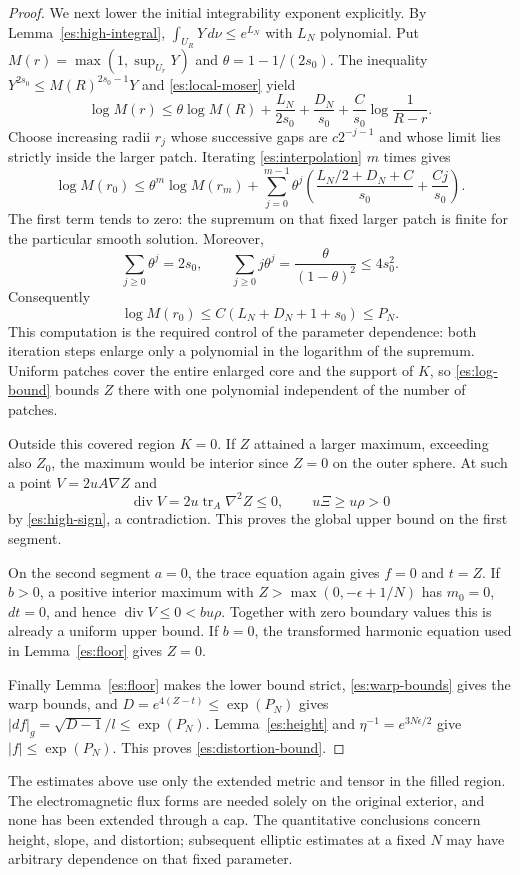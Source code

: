 \begin{proof}
We next lower the initial integrability exponent explicitly.
By Lemma~\ref{es:high-integral},
$\int_{U_R}Y\,d\nu\le e^{L_N}$ with $L_N$ polynomial.
Put $M(r)=\max(1,\sup_{U_r}Y)$ and
$\theta=1-1/(2s_0)$.  The inequality
$Y^{2s_0}\le M(R)^{2s_0-1}Y$ and
\eqref{es:local-moser} yield
\begin{equation}\label{es:interpolation}
 \log M(r)\le\theta\log M(R)
       +\frac{L_N}{2s_0}+\frac{D_N}{s_0}
       +\frac C{s_0}\log\frac1{R-r}.
\end{equation}
Choose increasing radii $r_j$ whose successive gaps are
$c2^{-j-1}$ and whose limit lies strictly inside the larger patch.
Iterating \eqref{es:interpolation} $m$ times gives
\[
 \log M(r_0)
 \le\theta^m\log M(r_m)
       +\sum_{j=0}^{m-1}\theta^j
           \left(\frac{L_N/2+D_N+C}{s_0}
                         +\frac{Cj}{s_0}\right).
\]
The first term tends to zero: the supremum on that fixed larger
patch is finite for the particular smooth solution.
Moreover,
\[
 \sum_{j\ge0}\theta^j=2s_0,
 \qquad \sum_{j\ge0}j\theta^j
             =\frac{\theta}{(1-\theta)^2}\le4s_0^2.
\]
Consequently
\begin{equation}\label{es:log-bound}
 \log M(r_0)\le C(L_N+D_N+1+s_0)\le P_N.
\end{equation}
This computation is the required control of the parameter dependence:
both iteration steps enlarge only a polynomial in the logarithm of
the supremum.  Uniform patches cover the entire enlarged core and
the support of $K$, so \eqref{es:log-bound} bounds $Z$ there with
one polynomial independent of the number of patches.

Outside this covered region $K=0$.  If $Z$ attained a larger
maximum, exceeding also $Z_0$, the maximum would be interior since
$Z=0$ on the outer sphere.  At such a point
$V=2uA\nabla Z$ and
\[
 \operatorname{div}V=2u\operatorname{tr}_A\nabla^2Z\le0,
 \qquad u\Xi\ge u\rho>0
\]
by \eqref{es:high-sign}, a contradiction.  This proves the global
upper bound on the first segment.

On the second segment $a=0$, the trace equation again gives $f=0$
and $t=Z$.  If $b>0$, a positive interior maximum with
$Z>\max(0,-\epsilon+1/N)$ has $m_0=0$, $dt=0$, and hence
$\operatorname{div}V\le0<b u\rho$.
Together with zero boundary values this is already a uniform upper
bound.  If $b=0$, the transformed harmonic equation used in
Lemma~\ref{es:floor} gives $Z=0$.

Finally Lemma~\ref{es:floor} makes the lower bound strict,
\eqref{es:warp-bounds} gives the warp bounds, and
$D=e^{4(Z-t)}\le\exp(P_N)$ gives
$|df|_g=\sqrt{D-1}/l\le\exp(P_N)$.
Lemma~\ref{es:height} and $\eta^{-1}=e^{3N\epsilon/2}$ give
$|f|\le\exp(P_N)$.  This proves
\eqref{es:distortion-bound}.
\end{proof}

The estimates above use only the extended metric and tensor in the
filled region.  The electromagnetic flux forms are needed solely on
the original exterior, and none has been extended through a cap.
The quantitative conclusions concern height, slope, and distortion;
subsequent elliptic estimates at a fixed $N$ may have arbitrary
dependence on that fixed parameter.
